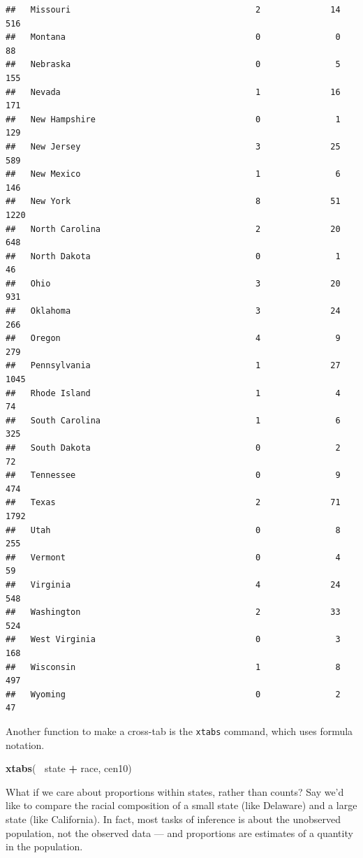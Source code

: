 \documentclass[
]{book}
\newenvironment{Shaded}{\begin{snugshade}}{\end{snugshade}}
\newcommand{\KeywordTok}[1]{\textcolor[rgb]{0.13,0.29,0.53}{\textbf{#1}}}
\newcommand{\NormalTok}[1]{#1}
\newcommand{\OperatorTok}[1]{\textcolor[rgb]{0.81,0.36,0.00}{\textbf{#1}}}
\newcommand{\StringTok}[1]{\textcolor[rgb]{0.31,0.60,0.02}{#1}}
\theoremstyle{definition}
\theoremstyle{definition}
\theoremstyle{definition}
\theoremstyle{definition}
\theoremstyle{remark}
\begin{document}
\begin{verbatim}
##   Missouri                                     2              14   516
##   Montana                                      0               0    88
##   Nebraska                                     0               5   155
##   Nevada                                       1              16   171
##   New Hampshire                                0               1   129
##   New Jersey                                   3              25   589
##   New Mexico                                   1               6   146
##   New York                                     8              51  1220
##   North Carolina                               2              20   648
##   North Dakota                                 0               1    46
##   Ohio                                         3              20   931
##   Oklahoma                                     3              24   266
##   Oregon                                       4               9   279
##   Pennsylvania                                 1              27  1045
##   Rhode Island                                 1               4    74
##   South Carolina                               1               6   325
##   South Dakota                                 0               2    72
##   Tennessee                                    0               9   474
##   Texas                                        2              71  1792
##   Utah                                         0               8   255
##   Vermont                                      0               4    59
##   Virginia                                     4              24   548
##   Washington                                   2              33   524
##   West Virginia                                0               3   168
##   Wisconsin                                    1               8   497
##   Wyoming                                      0               2    47
\end{verbatim}

Another function to make a cross-tab is the \texttt{xtabs} command, which uses formula notation.

\begin{Shaded}
\begin{Highlighting}[]
\KeywordTok{xtabs}\NormalTok{(}\OperatorTok{~}\StringTok{ }\NormalTok{state }\OperatorTok{+}\StringTok{ }\NormalTok{race, cen10)}
\end{Highlighting}
\end{Shaded}

What if we care about proportions within states, rather than counts? Say we'd like to compare the racial composition of a small state (like Delaware) and a large state (like California). In fact, most tasks of inference is about the unobserved population, not the observed data --- and proportions are estimates of a quantity in the population.
\end{document}
